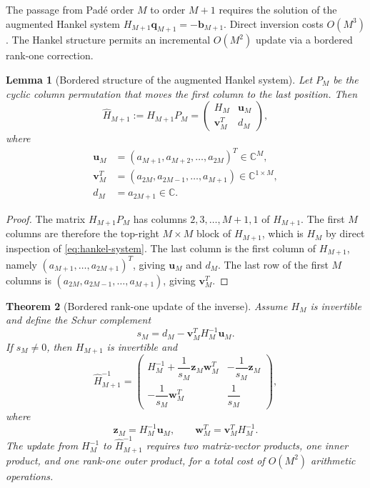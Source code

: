 \documentclass[11pt]{article}
\newtheorem{theorem}{Theorem}[section]
\newtheorem{lemma}[theorem]{Lemma}
\theoremstyle{definition}
\theoremstyle{remark}
\begin{document}
The passage from Pad\'e order $M$ to order $M+1$ requires the solution of the augmented Hankel system $H_{M+1}\bm{q}_{M+1}=-\bm{b}_{M+1}$. Direct inversion costs $O(M^{3})$. The Hankel structure permits an incremental $O(M^{2})$ update via a bordered rank-one correction.

\begin{lemma}[Bordered structure of the augmented Hankel system]
\label{lem:bordered}
Let $P_{M}$ be the cyclic column permutation that moves the first column to the last position. Then
\begin{equation}
\hat{H}_{M+1}:=H_{M+1}P_{M}=
\begin{pmatrix}
H_{M} & \mathbf{u}_{M}\\[2pt]
\mathbf{v}_{M}^{T} & d_{M}
\end{pmatrix},
\label{eq:bordered}
\end{equation}
where
\begin{align}
\mathbf{u}_{M}&=(a_{M+1},a_{M+2},\ldots,a_{2M})^{T}\in\mathbb{C}^{M},\\
\mathbf{v}_{M}^{T}&=(a_{2M},a_{2M-1},\ldots,a_{M+1})\in\mathbb{C}^{1\times M},\\
d_{M}&=a_{2M+1}\in\mathbb{C}.
\end{align}
\end{lemma}

\begin{proof}
The matrix $H_{M+1}P_{M}$ has columns $2,3,\ldots,M+1,1$ of $H_{M+1}$. The first $M$ columns are therefore the top-right $M\times M$ block of $H_{M+1}$, which is $H_{M}$ by direct inspection of \eqref{eq:hankel-system}. The last column is the first column of $H_{M+1}$, namely $(a_{M+1},\ldots,a_{2M+1})^{T}$, giving $\mathbf{u}_{M}$ and $d_{M}$. The last row of the first $M$ columns is $(a_{2M},a_{2M-1},\ldots,a_{M+1})$, giving $\mathbf{v}_{M}^{T}$.
\end{proof}

\begin{theorem}[Bordered rank-one update of the inverse]
\label{thm:rank-one}
Assume $H_{M}$ is invertible and define the Schur complement
\begin{equation}
s_{M}=d_{M}-\mathbf{v}_{M}^{T}H_{M}^{-1}\mathbf{u}_{M}.
\label{eq:schur}
\end{equation}
If $s_{M}\neq 0$, then $H_{M+1}$ is invertible and
\begin{equation}
\hat{H}_{M+1}^{-1}=
\begin{pmatrix}
H_{M}^{-1}+\dfrac{1}{s_{M}}\mathbf{z}_{M}\mathbf{w}_{M}^{T} & -\dfrac{1}{s_{M}}\mathbf{z}_{M}\\[8pt]
-\dfrac{1}{s_{M}}\mathbf{w}_{M}^{T} & \dfrac{1}{s_{M}}
\end{pmatrix},
\label{eq:rank-one-update}
\end{equation}
where
\begin{equation}
\mathbf{z}_{M}=H_{M}^{-1}\mathbf{u}_{M},\qquad
\mathbf{w}_{M}^{T}=\mathbf{v}_{M}^{T}H_{M}^{-1}.
\label{eq:zw}
\end{equation}
The update from $H_{M}^{-1}$ to $\hat{H}_{M+1}^{-1}$ requires two matrix-vector products, one inner product, and one rank-one outer product, for a total cost of $O(M^{2})$ arithmetic operations.
\end{theorem}
\end{document}
